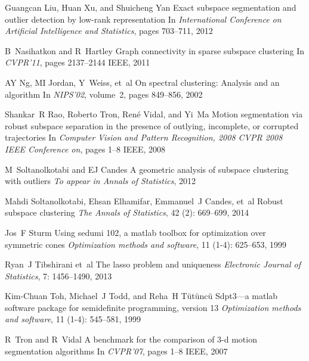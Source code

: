 \documentclass[12pt,heading]{ctexbook}
\begin{document}
\begin{thebibliography}{99}
    Guangcan Liu, Huan Xu, and Shuicheng Yan
    \newblock Exact subspace segmentation and outlier detection by low-rank
    representation
    \newblock In \emph{International Conference on Artificial Intelligence and
    Statistics}, pages 703--711, 2012

    B~Nasihatkon and R~Hartley
    \newblock Graph connectivity in sparse subspace clustering
    \newblock In \emph{CVPR'11}, pages 2137--2144 IEEE, 2011

    AY Ng, MI Jordan, Y~Weiss, et~al
    \newblock On spectral clustering: Analysis and an algorithm
    \newblock In \emph{NIPS'02}, volume~2, pages 849--856, 2002

    Shankar~R Rao, Roberto Tron, Ren{\'e} Vidal, and Yi~Ma
    \newblock Motion segmentation via robust subspace separation in the presence of
    outlying, incomplete, or corrupted trajectories
    \newblock In \emph{Computer Vision and Pattern Recognition, 2008 CVPR 2008
    IEEE Conference on}, pages 1--8 IEEE, 2008

    M~Soltanolkotabi and EJ Candes
    \newblock A geometric analysis of subspace clustering with outliers
    \newblock \emph{To appear in Annals of Statistics}, 2012

    Mahdi Soltanolkotabi, Ehsan Elhamifar, Emmanuel~J Candes, et~al
    \newblock Robust subspace clustering
    \newblock \emph{The Annals of Statistics}, 42 (2): 669--699,
    2014

    Jos~F Sturm
    \newblock Using sedumi 102, a matlab toolbox for optimization over symmetric
    cones
    \newblock \emph{Optimization methods and software}, 11 (1-4):
    625--653, 1999

    Ryan~J Tibshirani et~al
    \newblock The lasso problem and uniqueness
    \newblock \emph{Electronic Journal of Statistics}, 7: 1456--1490,
    2013

    Kim-Chuan Toh, Michael~J Todd, and Reha~H T{\"u}t{\"u}nc{\"u}
    \newblock Sdpt3—a matlab software package for semidefinite programming,
    version 13
    \newblock \emph{Optimization methods and software}, 11 (1-4):
    545--581, 1999

    R~Tron and R~Vidal
    \newblock A benchmark for the comparison of 3-d motion segmentation algorithms
    \newblock In \emph{CVPR'07}, pages 1--8 IEEE, 2007


\end{thebibliography}
\end{document}
